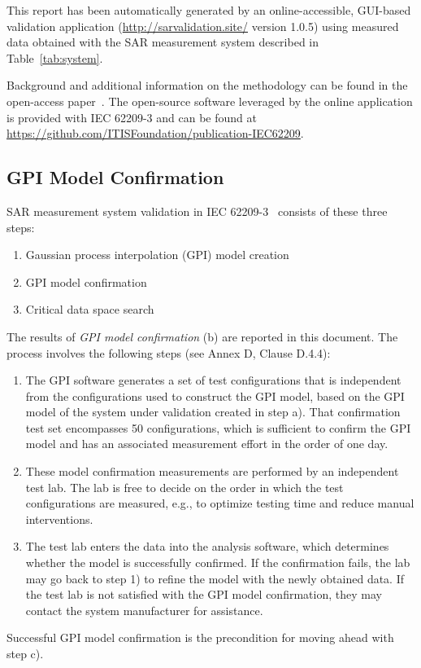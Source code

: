 \documentclass{article}
\begin{document}
This report has been automatically generated by an online-accessible, GUI-based validation application (\url{http://sarvalidation.site/} version 1.0.5) using measured data obtained with the SAR measurement system described in Table~\ref{tab:system}.

Background and additional information on the methodology can be found in the open-access paper~\cite{gpi-paper}. The open-source software leveraged by the online application is provided with IEC 62209-3 and can be found at
\url{https://github.com/ITISFoundation/publication-IEC62209}.


\subsection{GPI Model Confirmation}\label{sec:procedure}
SAR measurement system validation in IEC 62209-3~\cite{standard} consists of these three steps:

\begin{enumerate}[label=\alph*)]
\item Gaussian process interpolation (GPI) model creation
\item GPI model confirmation
\item Critical data space search
\end{enumerate}

The results of \textit{GPI model confirmation} (b) are reported in this document. The process involves the following steps (see Annex D, Clause D.4.4):

\begin{enumerate}[label=\arabic*)]
\item The GPI software generates a set of test configurations that is independent from the configurations used to construct the GPI model, based on the GPI model of the system under validation created in step a). That confirmation test set encompasses 50 configurations, which is sufficient to confirm the GPI model and has an associated measurement effort in the order of one day.
\item These model confirmation measurements are performed by an independent test lab. The lab is free to decide on the order in which the test configurations are measured, e.g., to optimize testing time and reduce manual interventions.
\item The test lab enters the data into the analysis software, which determines whether the model is successfully confirmed. If the confirmation fails, the lab may go back to step 1) to refine the model with the newly obtained data. If the test lab is not satisfied with the GPI model confirmation, they may contact the system manufacturer for assistance.
\end{enumerate}
Successful GPI model confirmation is the precondition for moving ahead with step c).
\end{document}
